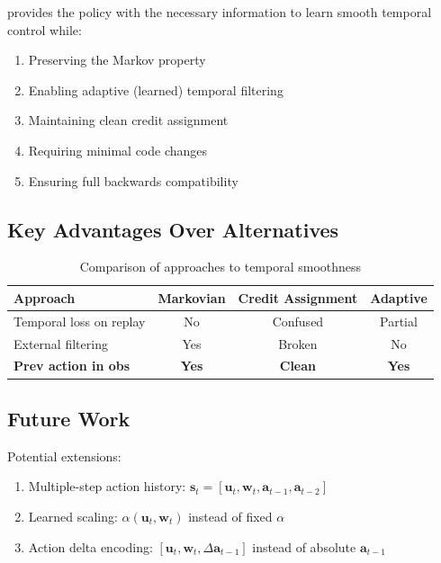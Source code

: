 \documentclass[11pt,a4paper]{article}
\theoremstyle{definition}
\begin{document}
provides the policy with the necessary information to learn smooth temporal control while:
\begin{enumerate}
    \item Preserving the Markov property
    \item Enabling adaptive (learned) temporal filtering
    \item Maintaining clean credit assignment
    \item Requiring minimal code changes
    \item Ensuring full backwards compatibility
\end{enumerate}

\subsection{Key Advantages Over Alternatives}

\begin{table}[h]
\centering
\small
\begin{tabular}{lccc}
\toprule
Approach & Markovian & Credit Assignment & Adaptive \\
\midrule
Temporal loss on replay & No & Confused & Partial \\
External filtering & Yes & Broken & No \\
\textbf{Prev action in obs} & \textbf{Yes} & \textbf{Clean} & \textbf{Yes} \\
\bottomrule
\end{tabular}
\caption{Comparison of approaches to temporal smoothness}
\end{table}

\subsection{Future Work}

Potential extensions:
\begin{enumerate}
    \item Multiple-step action history: $\mathbf{s}_t = [\mathbf{u}_t, \mathbf{w}_t, \mathbf{a}_{t-1}, \mathbf{a}_{t-2}]$
    \item Learned scaling: $\alpha(\mathbf{u}_t, \mathbf{w}_t)$ instead of fixed $\alpha$
    \item Action delta encoding: $[\mathbf{u}_t, \mathbf{w}_t, \Delta \mathbf{a}_{t-1}]$ instead of absolute $\mathbf{a}_{t-1}$
\end{enumerate}
\end{document}
